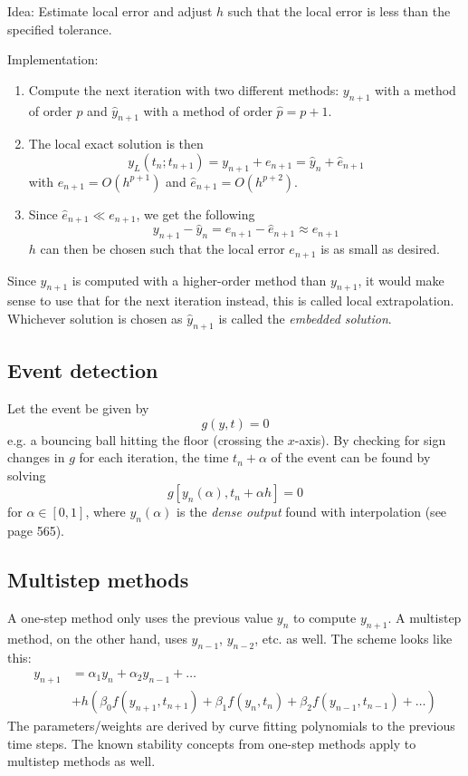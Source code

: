 Idea: Estimate local error and adjust $h$ such that the local error is less than the specified tolerance.

Implementation:
\begin{enumerate}
    \item Compute the next iteration with two different methods: $y_{n+1}$ with a method of order $p$ and ${\hat{y}_{n+1}}$ with a method of order $\hat{p} = p+1$.
    \item The local exact solution is then
    \begin{equation}
        y_L(t_n;t_{n+1}) = y_{n+1} + e_{n+1} = \hat{y}_{n} + \hat{e}_{n+1}
    \end{equation}
    with $e_{n+1} = O(h^{p+1})$ and $\hat{e}_{n+1} = O(h^{p+2})$.
    \item Since $\hat{e}_{n+1} \ll e_{n+1}$, we get the following 
    \begin{equation}
        y_{n+1} - \hat{y}_{n} = e_{n+1} - \hat{e}_{n+1} \approx e_{n+1}
    \end{equation}
    $h$ can then be chosen such that the local error $e_{n+1}$ is as small as desired.
\end{enumerate}

Since $\hat{y}_{n+1}$ is computed with a higher-order method than $y_{n+1}$, it would make sense to use that for the next iteration instead, this is called local extrapolation. Whichever solution is chosen as $\hat{y}_{n+1}$ is called the \emph{embedded solution}.

\subsection{Event detection}
Let the event be given by
\begin{equation}
    g(y,t) = 0
\end{equation}
e.g. a bouncing ball hitting the floor (crossing the $x$-axis). By checking for sign changes in $g$ for each iteration, the time $t_n + \alpha$ of the event can be found by solving
\begin{equation}
    g[y_n(\alpha), t_n + \alpha h] = 0
\end{equation}
for $\alpha \in [0,1]$, where $y_n(\alpha)$ is the \emph{dense output} found with interpolation (see page 565).

\subsection{Multistep methods}
A one-step method only uses the previous value $y_n$ to compute $y_{n+1}$. A multistep method, on the other hand, uses $y_{n-1}$, $y_{n-2}$, etc. as well. The scheme looks like this:
\begin{equation}
    \begin{split}
    y_{n+1} &= \alpha_1 y_n + \alpha_2 y_{n-1} + \dots \\ &+ h(\beta_0 f(y_{n+1}, t_{n+1}) + \beta_1 f(y_n, t_n) + \beta_2 f(y_{n-1}, t_{n-1}) + \dots)
    \end{split}
\end{equation}
The parameters/weights are derived by curve fitting polynomials to the previous time steps.
The known stability concepts from one-step methods apply to multistep methods as well.
